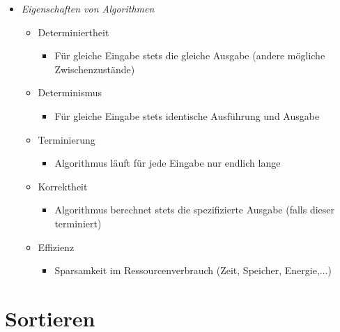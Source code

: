\begin{itemize}
    \item \textit{Eigenschaften von Algorithmen}
        \begin{itemize}
	    	\item Determiniertheit
	    		\begin{itemize}
	    			\item[] Für gleiche Eingabe stets die gleiche Ausgabe (andere mögliche Zwischenzustände)
	    		\end{itemize}
	    	\item Determinismus
	    		\begin{itemize}
	    			\item[] Für gleiche Eingabe stets identische Ausführung und Ausgabe
	    		\end{itemize}
	    	\item Terminierung
	    		\begin{itemize}
	    			\item[] Algorithmus läuft für jede Eingabe nur endlich lange
	    		\end{itemize}
	    	\item Korrektheit
	    		\begin{itemize}
	    			\item[] Algorithmus berechnet stets die spezifizierte Ausgabe (falls dieser terminiert)
	    		\end{itemize}
	    	\item Effizienz
	    		\begin{itemize}
	    			\item[] Sparsamkeit im Ressourcenverbrauch (Zeit, Speicher, Energie,...)
	    		\end{itemize}
	    \end{itemize}
\end{itemize}

\pagebreak

\section{Sortieren}

